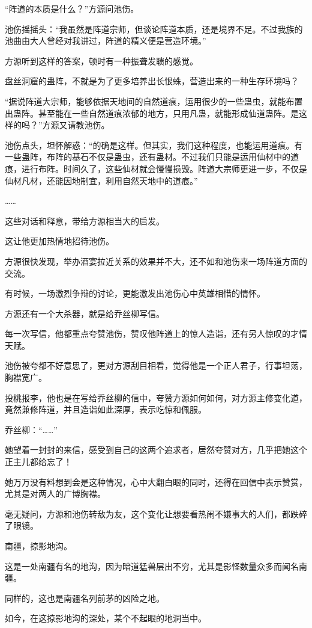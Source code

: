 \begin{this_body}
“阵道的本质是什么？”方源问池伤。

池伤摇摇头：“我虽然是阵道宗师，但谈论阵道本质，还是境界不足。不过我族的池曲由大人曾经对我讲过，阵道的精义便是营造环境。”

方源听到这样的答案，顿时有一种振聋发聩的感觉。

盘丝洞窟的蛊阵，不就是为了更多培养出长恨蛛，营造出来的一种生存环境吗？

“据说阵道大宗师，能够依据天地间的自然道痕，运用很少的一些蛊虫，就能布置出蛊阵。甚至能在一些自然道痕浓郁的地方，只用凡蛊，就能形成仙道蛊阵。是这样的吗？”方源又请教池伤。

池伤点头，坦怀解惑：“的确是这样。但其实，我们这种程度，也能运用道痕。有一些蛊阵，布阵的基石不仅是蛊虫，还有蛊材。不过我们只能是运用仙材中的道痕，进行布阵。时间久了，这些仙材就会慢慢损毁。阵道大宗师更进一步，不仅是仙材凡材，还能因地制宜，利用自然天地中的道痕。”

……

这些对话和释意，带给方源相当大的启发。

这让他更加热情地招待池伤。

方源很快发现，举办酒宴拉近关系的效果并不大，还不如和池伤来一场阵道方面的交流。

有时候，一场激烈争辩的讨论，更能激发出池伤心中英雄相惜的情怀。

方源还有一个大杀器，就是给乔丝柳写信。

每一次写信，他都重点夸赞池伤，赞叹他阵道上的惊人造诣，还有另人惊叹的才情天赋。

池伤被夸都不好意思了，更对方源刮目相看，觉得他是一个正人君子，行事坦荡，胸襟宽广。

投桃报李，他也是在写给乔丝柳的信中，夸赞方源如何如何，对方源主修变化道，竟然兼修阵道，并且造诣如此深厚，表示吃惊和佩服。

乔丝柳：“……”

她望着一封封的来信，感受到自己的这两个追求者，居然夸赞对方，几乎把她这个正主儿都给忘了！

她万万没有料想到会是这种情况，心中大翻白眼的同时，还得在回信中表示赞赏，尤其是对两人的广博胸襟。

毫无疑问，方源和池伤转敌为友，这个变化让想要看热闹不嫌事大的人们，都跌碎了眼镜。

南疆，掠影地沟。

这是一处南疆有名的地沟，因为暗道猛兽层出不穷，尤其是影怪数量众多而闻名南疆。

同样的，这也是南疆名列前茅的凶险之地。

如今，在这掠影地沟的深处，某个不起眼的地洞当中。


\end{this_body}
